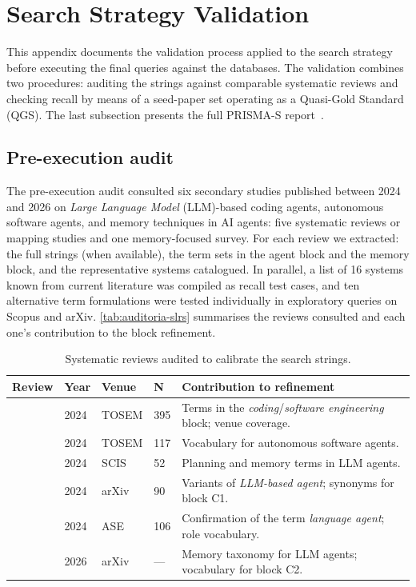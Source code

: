 \appendix
\section{Search Strategy Validation}
\label{ap:search-validation}

This appendix documents the validation process applied to the search strategy before
executing the final queries against the databases.
The validation combines two procedures: auditing the strings against comparable systematic
reviews and checking recall by means of a seed-paper set operating as a Quasi-Gold Standard
(QGS).
The last subsection presents the full PRISMA-S report~\citep{rethlefsen2021prismas}.

\subsection{Pre-execution audit}
\label{ap:auditoria}

The pre-execution audit consulted six secondary studies published
between 2024 and 2026 on \textit{Large Language Model} (LLM)-based coding agents, autonomous
software agents, and memory techniques in AI agents: five systematic reviews or mapping
studies and one memory-focused survey.
For each review we extracted: the full strings (when available), the term sets in the agent
block and the memory block, and the representative systems catalogued.
In parallel, a list of 16 systems known from current literature was compiled as recall
test cases, and ten alternative term formulations were tested individually in exploratory
queries on Scopus and arXiv.
\autoref{tab:auditoria-slrs} summarises the reviews consulted and each one's contribution
to the block refinement.

\begin{table}[htbp]
\centering
\caption{Systematic reviews audited to calibrate the search strings.}
\label{tab:auditoria-slrs}
\small
\begin{tabular}{p{3.2cm}p{1cm}p{2.2cm}p{1cm}p{4.5cm}}
\toprule
\textbf{Review} & \textbf{Year} & \textbf{Venue} & \textbf{N} & \textbf{Contribution to refinement} \\
\midrule
\citet{hou2024llmse} & 2024 & TOSEM & 395 & Terms in the \textit{coding}/\textit{software engineering} block; venue coverage. \\
\citet{liu2024llmagents} & 2024 & TOSEM & 117 & Vocabulary for autonomous software agents. \\
\citet{zhang2024unifying} & 2024 & SCIS & 52 & Planning and memory terms in LLM agents. \\
\citet{jin2024llmagents} & 2024 & arXiv & 90 & Variants of \textit{LLM-based agent}; synonyms for block C1. \\
\citet{wang2024llmagents} & 2024 & ASE & 106 & Confirmation of the term \textit{language agent}; role vocabulary. \\
\citet{du2026memory} & 2026 & arXiv & --- & Memory taxonomy for LLM agents; vocabulary for block C2. \\
\bottomrule
\end{tabular}
\end{table}

